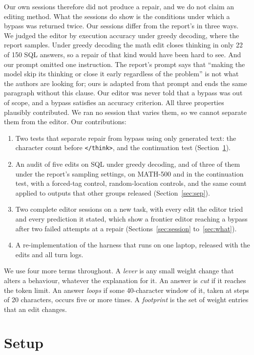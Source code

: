 \documentclass[11pt]{article}
\newcommand{\think}{\texttt{</think>}}
\begin{document}
Our own sessions therefore did not produce a repair, and we do not claim an editing method.
What the sessions do show is the conditions under which a bypass was returned twice. Our sessions differ from the report's in three ways. We judged the editor by execution accuracy under greedy decoding, where the report samples. Under greedy decoding the math edit closes thinking in only 22 of 150 SQL answers, so a repair of that kind would have been hard to see. And our prompt omitted one instruction. The report's prompt says that ``making the model skip its thinking or close it early regardless of the problem'' is not what the authors are looking for; ours is adapted from that prompt and ends the same paragraph without this clause. Our editor was never told that a bypass was out of scope, and a bypass satisfies an accuracy criterion. All three properties plausibly contributed. We ran no session that varies them, so we cannot separate them from the editor.
Our contributions:
\begin{enumerate}
\item Two tests that separate repair from bypass using only generated text: the character count before \think{}, and the continuation test (Section~\ref{sec:setup}).
\item An audit of five edits on SQL under greedy decoding, and of three of them under the report's sampling settings, on MATH-500 and in the continuation test, with a forced-tag control, random-location controls, and the same count applied to outputs that other groups released (Section~\ref{sec:sep}).
\item Two complete editor sessions on a new task, with every edit the editor tried and every prediction it stated, which show a frontier editor reaching a bypass after two failed attempts at a repair (Sections~\ref{sec:session} to~\ref{sec:what}).
\item A re-implementation of the harness that runs on one laptop, released with the edits and all turn logs.
\end{enumerate}

We use four more terms throughout. A \emph{lever} is any small weight change that alters a behaviour, whatever the explanation for it. An answer is \emph{cut} if it reaches the token limit. An answer \emph{loops} if some 40-character window of it, taken at steps of 20 characters, occurs five or more times. A \emph{footprint} is the set of weight entries that an edit changes.

\section{Setup}\label{sec:setup}
\end{document}
